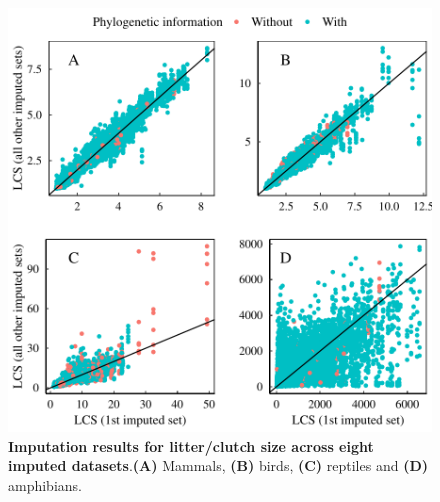 \documentclass[11pt]{article}
\begin{document}
\begin{figure}[h!]
\centering
\includegraphics[scale=0.6]{figures/Congruence_continuous_traits/LCS}
\caption[Imputation results for litter/clutch size across eight imputed datasets]{\textbf{Imputation results for litter/clutch size across eight imputed datasets}.\textbf{(A)} Mammals, \textbf{(B)} birds, \textbf{(C)} reptiles and \textbf{(D)} amphibians.}
\label{congruenceLCS}
\end{figure}

\pagebreak
\end{document}
